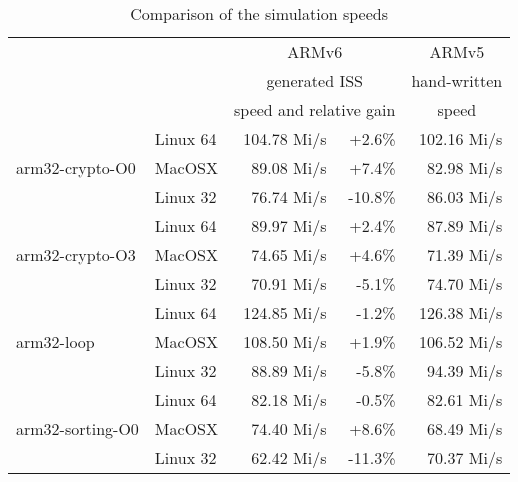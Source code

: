 \documentclass[conference]{ieeeconf}
\begin{document}
\begin{table}\centering
\caption{Comparison of the simulation speeds}
\begin{tabular}{l|l|rr|r}
\multicolumn{2}{l|}{~} & \multicolumn{2}{|c|}{ARMv6} & \multicolumn{1}{c}{ARMv5} \\
\multicolumn{2}{l|}{~} & \multicolumn{2}{|c|}{generated ISS} & \multicolumn{1}{c}{hand-written} \\
\multicolumn{2}{l|}{~} & \multicolumn{2}{|c|}{speed and relative gain} & \multicolumn{1}{c}{speed} \\\hline
\multirow{3}{*}{arm32-crypto-O0}  & Linux 64  & 104.78 Mi/s\hspace*{-2.5mm} & +2.6\% & 102.16 Mi/s \\
                                  & MacOSX    & 89.08 Mi/s\hspace*{-2.5mm}  & +7.4\% & 82.98 Mi/s  \\
                                  & Linux 32  & 76.74 Mi/s\hspace*{-2.5mm}  &\hspace*{-2.5mm}-10.8\% & 86.03 Mi/s  \\\hline

\multirow{3}{*}{arm32-crypto-O3}  & Linux 64  & 89.97 Mi/s\hspace*{-2.5mm}  & +2.4\% & 87.89 Mi/s  \\
                                  & MacOSX    & 74.65 Mi/s\hspace*{-2.5mm}  & +4.6\% & 71.39 Mi/s  \\
                                  & Linux 32  & 70.91 Mi/s\hspace*{-2.5mm}  & -5.1\% & 74.70 Mi/s  \\\hline

\multirow{3}{*}{arm32-loop}       & Linux 64  & 124.85 Mi/s\hspace*{-2.5mm} & -1.2\% & 126.38 Mi/s \\
                                  & MacOSX    & 108.50 Mi/s\hspace*{-2.5mm} & +1.9\% & 106.52 Mi/s \\
                                  & Linux 32  & 88.89 Mi/s\hspace*{-2.5mm}  & -5.8\% & 94.39 Mi/s  \\\hline

\multirow{3}{*}{arm32-sorting-O0} & Linux 64  & 82.18 Mi/s\hspace*{-2.5mm}  & -0.5\% & 82.61 Mi/s  \\
                                  & MacOSX    & 74.40 Mi/s\hspace*{-2.5mm}  & +8.6\% & 68.49 Mi/s  \\
                                  & Linux 32  & 62.42 Mi/s\hspace*{-2.5mm}  &\hspace*{-2.5mm}-11.3\% & 70.37 Mi/s  \\\hline


\end{tabular}
\end{table}
\end{document}
